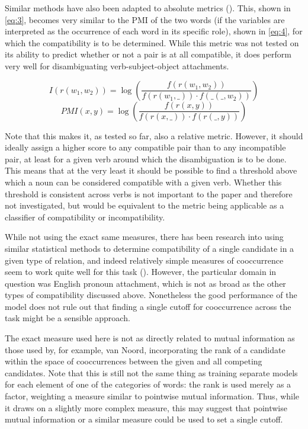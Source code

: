 \documentclass[a4paper, 12pt]{scrartcl}
\begin{document}
Similar methods have also been adapted to absolute metrics (\cite{vanNoord}). This, shown in \ref{eq:3}, becomes very similar to the PMI of the two words (if the variables are interpreted as the occurrence of each word in its specific role), shown in \ref{eq:4}, for which the compatibility is to be determined. While this metric was not tested on its ability to predict whether or not a pair is at all compatible, it does perform very well for disambiguating verb-subject-object attachments.

\begin{equation} \label{eq:3}
	I(r(w_1, w_2)) = \log\left(\frac{f(r(w_1, w_2))}{f(r(w_1, \_ )) \cdot f(\_ (\_ , w_2))}\right)
\end{equation}
\begin{equation} \label{eq:4}
	PMI(x, y) = \log\left(\frac{f(r(x, y))}{f(r(x, \_ )) \cdot f(r(\_ , y))}\right)
\end{equation}

Note that this makes it, as tested so far, also a relative metric. However, it should ideally assign a higher score to any compatible pair than to any incompatible pair, at least for a given verb around which the disambiguation is to be done. This means that at the very least it should be possible to find a threshold above which a noun can be considered compatible with a given verb. Whether this threshold is consistent across verbs is not important to the paper and therefore not investigated, but would be equivalent to the metric being applicable as a classifier of compatibility or incompatibility.

While not using the exact same measures, there has been research into using similar statistical methods to determine compatibility of a single candidate in a given type of relation, and indeed relatively simple measures of cooccurrence seem to work quite well for this task (\cite{YangSuTan}). However, the particular domain in question was English pronoun attachment, which is not as broad as the other types of compatibility discussed above. Nonetheless the good performance of the model does not rule out that finding a single cutoff for cooccurrence across the task might be a sensible approach.

The exact measure used here is not as directly related to mutual information as those used by, for example, van Noord, incorporating the rank of a candidate within the space of cooccurrences between the given and all competing candidates. Note that this is still not the same thing as training separate models for each element of one of the categories of words: the rank is used merely as a factor, weighting a measure similar to pointwise mutual information. Thus, while it draws on a slightly more complex measure, this may suggest that pointwise mutual information or a similar measure could be used to set a single cutoff.
\end{document}
